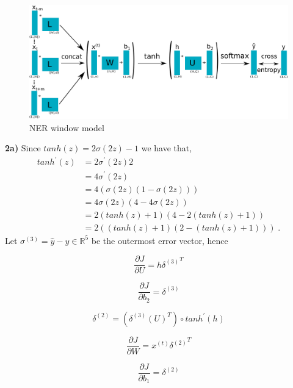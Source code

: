 \documentclass{article}
\begin{document}
\begin{figure}
\begin{center}
\includegraphics[scale=0.85]{ner.pdf}
\end{center}
\caption{NER window model}
\label{ner}
\end{figure}
\textbf{2a)} Since $tanh(z) = 2\sigma(2z) -1 $ we have that, 
\begin{align*}
tanh^{\prime}(z) & = 2\sigma^{\prime}(2z)2 \\
& =4\sigma^{\prime}(2z) \\
& = 4(\sigma(2z)(1 - \sigma(2z))) \\
& = 4\sigma(2z)(4 - 4\sigma(2z))\\
& =  2(tanh(z)+1)(4 - 2(tanh(z)+1))\\
& = 2((tanh(z)+1)(2 - (tanh(z)+1)))\; .
\end{align*}
Let $\sigma^{(3)} = \hat{y} - y \in \mathbb{R}^{5}$ be the outermost error vector, hence

\begin{equation}\label{eq:6}
\frac{\partial J}{\partial  U} = {h \delta^{(3)}}^{T}
\end{equation}

\begin{equation}\label{eq:7}
\frac{\partial J}{\partial  b_{2}} =  \delta^{(3)}
\end{equation}

\begin{equation}\label{eq:8}
\delta^{(2)} = (\delta^{(3)} {(U)}^{T}) \circ {tanh^{\prime}} (h)
\end{equation}

\begin{equation}\label{eq:9}
\frac{\partial J}{\partial  W} = {x^{(t)} \delta^{(2)}}^{T}
\end{equation}

\begin{equation}\label{eq:10}
\frac{\partial J}{\partial  b_{1}} =  \delta^{(2)}
\end{equation}
\end{document}
